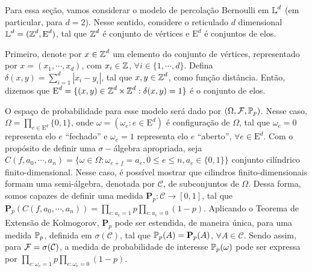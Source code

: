 \par Para essa seção, vamos considerar o modelo de percolação Bernoulli em $\operatorname{\mathbb{L}}^d$ (em particular, para $d = 2$). Nesse sentido, considere o reticulado $d$ dimensional $\operatorname{\mathbb{L}}^d = (\operatorname{\mathbb{Z}}^d, \text{E}^d)$, tal que $\operatorname{\mathbb{Z}}^d$ é conjunto de vértices e $\text{E}^d$ é conjuntos de elos.

\par Primeiro, denote por $x \in \operatorname{\mathbb{Z}}^d$ um elemento do conjunto de vértices, representado por $x = (x_1, \cdots, x_d)$, com $x_i \in \operatorname{\mathbb{Z}}$, $\forall i \in \{1, \cdots, d\}$. Defina $\delta(x, y) = \sum_{i = 1}^{d} |x_i - y_i|$, tal que $x, y \in \operatorname{\mathbb{Z}}^d$, como função distância. Então, dizemos que $\text{E}^d = \{(x, y) \in \operatorname{\mathbb{Z}}^d \times \operatorname{\mathbb{Z}}^d: \delta(x, y) = 1\}$ é o conjunto de elos.

\par O espaço de probabilidade para esse modelo será dado por $(\Omega, \operatorname{\mathcal{F}}, \operatorname{\mathbb{P}}_p)$. Nesse caso, $\Omega = \prod_{e \in \text{E}^d} \{0, 1\}$, onde $\omega = (\omega_e: e \in \text{E}^d)$ é configuração de $\Omega$, tal que $\omega_e = 0$ representa elo $e$ ``fechado'' e $\omega_e = 1$ representa elo $e$ ``aberto'', $\forall e \in \text{E}^d$. Com o propósito de definir uma $\sigma-$álgebra apropriada, seja $C(f, a_0, \cdots, a_n) = \{\omega \in \Omega : \omega_{e + f} = a_e, 0 \leq e \leq n, a_e \in \{0, 1\}\}$ conjunto cilíndrico finito-dimensional. Nesse caso, é possível mostrar que cilindros finito-dimensionais formam uma semi-álgebra, denotada por $\mathcal{C}$, de subconjuntos de $\Omega$. Dessa forma, somos capazes de definir uma medida $\mathbf{P}_p: \mathcal{C} \longrightarrow [0, 1]$, tal que $\mathbf{P}_p(C(f, a_0, \cdots, a_n)) = \prod_{e: a_e = 1} p \prod_{e: a_e = 0} (1 - p)$. Aplicando o Teorema de Extensão de Kolmogorov, $\mathbf{P}_p$ pode ser estendida, de maneira única, para uma medida $\operatorname{\mathbb{P}}_p$, definida em $\sigma(\mathcal{C})$, tal que $\operatorname{\mathbb{P}}_p(A) = \mathbf{P}_p(A)$, $\forall A \in \mathcal{C}$. Sendo assim, para $\operatorname{\mathcal{F}} = \sigma(\mathcal{C})$, a medida de probabilidade de interesse $\operatorname{\mathbb{P}}_p(\omega)$ pode ser expressa por $\prod_{e:\omega_e = 1} p \prod_{e:\omega_e = 0} (1 - p)$. 


